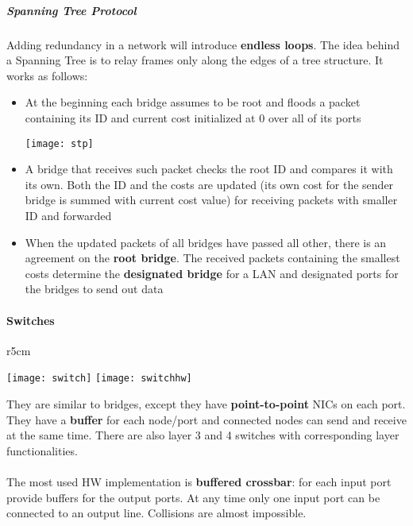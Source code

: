 \subparagraph{Spanning Tree Protocol} Adding redundancy in a network will introduce \textbf{endless loops}. The idea behind a Spanning Tree is to relay frames only along the edges of a tree structure. It works as follows:
\begin{itemize}
	\item At the beginning each bridge assumes to be root and floods a packet containing its ID and current cost initialized at $0$ over all of its ports
	\begin{center}
		\texttt{[image: stp]}
	\end{center}
	\item A bridge that receives such packet checks the root ID and compares it with its own. Both the ID and the costs are updated (its own cost for the sender bridge is summed with current cost value) for receiving packets with smaller ID and forwarded
	\item When the updated packets of all bridges have passed all other, there is an agreement on the \textbf{root bridge}. The received packets containing the smallest costs determine the \textbf{designated bridge} for a LAN and designated ports for the bridges to send out data
\end{itemize}

\paragraph{Switches}
\begin{wrapfigure}[15]{r}{5cm}
	\vspace{-0.5cm}
	\begin{center}
		\texttt{[image: switch]}
		\texttt{[image: switchhw]}
	\end{center}
\end{wrapfigure}
They are similar to bridges, except they have \textbf{point-to-point} NICs on each port. They have a \textbf{buffer} for each node/port and connected nodes can send and receive at the same time. There are also layer 3 and 4 switches with corresponding layer functionalities.\\\\
The most used HW implementation is \textbf{buffered crossbar}: for each input port provide buffers for the output ports. At any time only one input port can be connected to an output line. Collisions are almost impossible.


